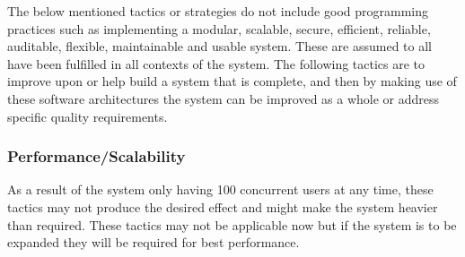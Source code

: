 \documentclass{article}
\begin{document}
The below mentioned tactics or strategies do not include good programming practices such as implementing a modular, scalable, secure, efficient, reliable, auditable, flexible, maintainable and usable system. These are assumed to all have been fulfilled in all contexts of the system. The following tactics are to improve upon or help build a system that is complete, and then by making use of these software architectures the system can be improved as a whole or address specific quality requirements.

		\subsubsection{Performance/Scalability}

			As a result of the system only having 100 concurrent users at any time, these tactics may not produce the desired effect and might make the system heavier than required. These tactics may not be applicable now but if the system is to be expanded they will be required for best performance.
\end{document}
